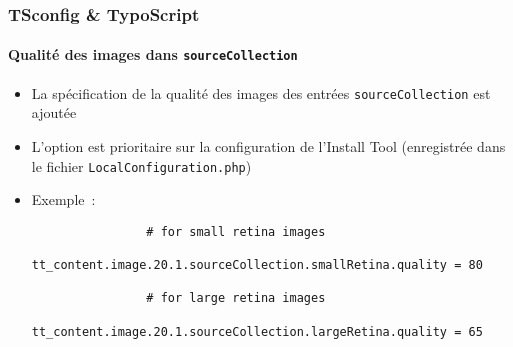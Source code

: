 \begin{frame}[fragile]
	\frametitle{TSconfig \& TypoScript}
	\framesubtitle{Qualité des images dans \texttt{sourceCollection}}

	\lstset{basicstyle=\tiny\ttfamily}

	\begin{itemize}

		\item La spécification de la qualité des images des entrées \texttt{sourceCollection} est ajoutée

		\item L'option est prioritaire sur la configuration de l'Install Tool\newline
			(enregistrée dans le fichier \texttt{LocalConfiguration.php})

		\item Exemple~:

			\begin{lstlisting}
				# for small retina images
				tt_content.image.20.1.sourceCollection.smallRetina.quality = 80

				# for large retina images
				tt_content.image.20.1.sourceCollection.largeRetina.quality = 65
			\end{lstlisting}

	\end{itemize}

\end{frame}


